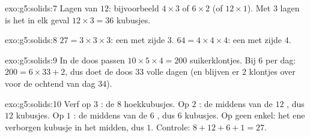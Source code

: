 \begin{solution}{exo:g5:solids:7}
Lagen van $12$: bijvoorbeeld $4 \times 3$ of $6 \times 2$ (of
$12 \times 1$). Met $3$ lagen is het  in elk geval
$12 \times 3 = 36$ kubusjes.
\end{solution}

\begin{solution}{exo:g5:solids:8}
$27 = 3 \times 3 \times 3$: een  met zijde $3$.
$64 = 4 \times 4 \times 4$: een  met zijde $4$.
\end{solution}

\begin{solution}{exo:g5:solids:9}
In de doos passen $10 \times 5 \times 4 = 200$ suikerklontjes. Bij $6$ per
dag: $200 = 6 \times 33 + 2$, dus doet de doos $33$ volle dagen (en blijven er
$2$ klontjes over voor de ochtend van dag $34$).
\end{solution}

\begin{solution}{exo:g5:solids:10}
Verf op $3$ : de $8$ hoekkubusjes. Op $2$ : de middens van
de $12$ , dus $12$ kubusjes. Op $1$ : de middens van de $6$
, dus $6$ kubusjes. Op geen enkel: het ene verborgen kubusje in het
midden, dus $1$. Controle: $8 + 12 + 6 + 1 = 27$. \checkmark
\end{solution}
